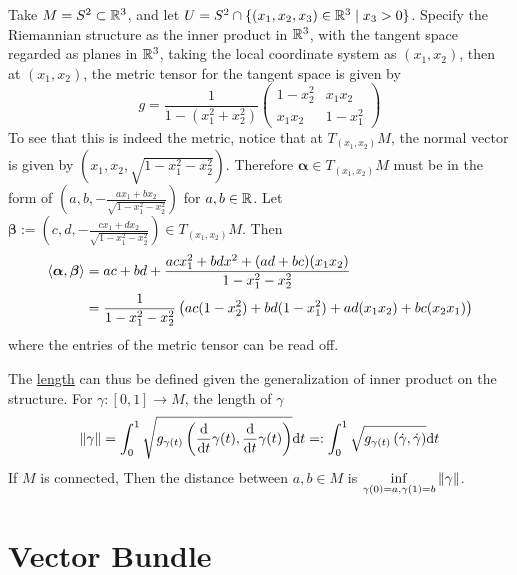 \documentclass{article}
\begin{document}
\begin{example}
    Take $M = S^2 \subset \mathbb{R}^3$, and let $U = S^2 \cap \{ (x_1, x_2, x_3) \in \mathbb{R}^3 \mid x_3 > 0 \}$. Specify the Riemannian structure as the inner product in $\mathbb{R}^3$, with the tangent space regarded as planes in $\mathbb{R}^3$, taking the local coordinate system as $(x_1, x_2)$, then at $(x_1, x_2)$, the metric tensor for the tangent space is given by
    \[
        g = \frac{1}{1- (x_1^2 + x_2^2)} \begin{pmatrix}
            1 - x_2^2 & x_1 x_2 \\
            x_1 x_2 & 1 - x_1^2
        \end{pmatrix}
    \]
    To see that this is indeed the metric, notice that at $T_{(x_1, x_2)} M$, the normal vector is given by $(x_1, x_2, \sqrt{1 - x_1^2 - x_2^2})$. Therefore $\bm{\alpha} \in T_{(x_1, x_2)}M$ must be in the form of $(a, b, -\frac{a x_1 + b x_2}{\sqrt{1 - x_1^2 - x_2^2}})$ for $a, b \in \mathbb{R}$. Let $\bm{\beta} := (c, d, -\frac{c x_1 + d x_2}{\sqrt{1 - x_1^2 - x_2^2}}) \in T_{(x_1, x_2)} M$. Then
    \begin{align*}
        \left\langle \bm{\alpha}, \bm{\beta} \right\rangle 
        & = ac + bd + \frac{ac x_1^2 + bd x^2 + (ad + bc)(x_1 x_2)}{1 - x_1^2 - x_2^2} \\
        & = \frac{1}{1 - x_1^2 - x_2^2} \left( ac(1 - x_2^2) + bd(1 - x_1^2) + ad(x_1 x_2) + bc(x_2 x_1) \right)
    \end{align*}
    where the entries of the metric tensor can be read off. 
\end{example}

\begin{observation}
    The \underline{length} can thus be defined given the generalization of inner product on the structure. For $\gamma: [0, 1] \to M$, the length of $\gamma$
    \[
        \left\|\gamma\right\| = \int_{0}^{1} \sqrt{g_{\gamma(t)} \left(\frac{\mathrm{d} }{\mathrm{d} t}{\gamma(t)}, \frac{\mathrm{d} }{\mathrm{d} t}{\gamma(t)}\right)}\mathrm{d} t =: \int_{0}^{1} \sqrt{g_{\gamma(t)} \left(\dot{\gamma}, \dot{\gamma}\right)} \mathrm{d} t
    \]
    If $M$ is connected, Then the distance between $a, b \in M$ is $\inf\limits_{\gamma(0) = a, \gamma(1) = b} \left\|\gamma\right\|$.
\end{observation}

\section{Vector Bundle}
\end{document}

